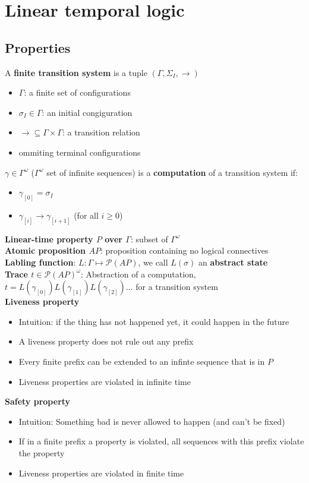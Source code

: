 \documentclass{article}
\def\li{\rightarrow}
\def\P{\mathcal{P}}
\begin{document}
\section{Linear temporal logic}
\subsection{Properties}
A \textbf{finite transition system} is a tuple $(\Gamma, \Sigma_I, \li)$
\begin{itemize}
    \item $\Gamma$: a finite set of configurations
    \item $\sigma_I\in \Gamma$: an initial congiguration
    \item $\li \subseteq \Gamma \times \Gamma$: a transition relation
    \item ommiting terminal configurations
\end{itemize} \smallskip
$\gamma \in \Gamma^\omega$ ($\Gamma^\omega$ set of infinite sequences) is a \textbf{computation} of a transition system if:
\begin{itemize}
    \item $\gamma_{[0]}=\sigma_I$
    \item $\gamma_{[i]} \li \gamma_{[i+1]}$ (for all $i \geq 0$)
\end{itemize} \smallskip
\textbf{Linear-time property $P$ over $\Gamma$}: subset of $\Gamma^\omega$ \smallskip \\
\textbf{Atomic proposition $AP$}: proposition containing no logical connectives \smallskip \\
\textbf{Labling function}: $L:\Gamma \mapsto \P(AP)$, we call $L(\sigma)$ an \textbf{abstract state} \smallskip \\
\textbf{Trace $t\in \P(AP)^\omega$}: Abstraction of a computation, $t = L(\gamma_{[0]})L(\gamma_{[1]})L(\gamma_{[2]})...$ for a transition system \smallskip \\
\textbf{Liveness property} \begin{itemize}
    \item Intuition: if the thing has not happened yet, it could happen in the future
    \item A liveness property does not rule out any prefix
    \item Every finite prefix can be extended to an infinte sequence that is in $P$
    \item Liveness properties are violated in infinite time
\end{itemize} \smallskip
\textbf{Safety property} \begin{itemize}
    \item Intuition: Something bad is never allowed to happen (and can't be fixed)
    \item If in a finite prefix a property is violated, all sequences with this prefix violate the property
    \item Liveness properties are violated in finite time
\end{itemize} \smallskip
\end{document}
